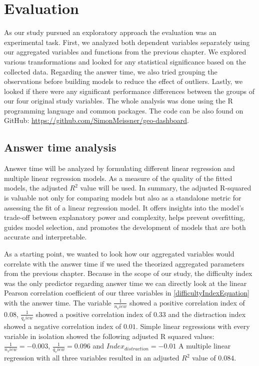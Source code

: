 \chapter{Evaluation}
As our study pursued an exploratory approach the evaluation was an experimental task. First, we analyzed both dependent variables separately
using our aggregated variables and functions from the previous chapter. We explored various transformations and looked for any statistical
significance based on the collected data. Regarding the answer time, we also tried grouping the observations before building models to reduce the 
effect of outliers. Lastly, we looked if there were any significant performance differences between
the groups of our four original study variables. The whole analysis was done using the R programming language and common packages. The code can be also
found on GitHub: \url{https://github.com/SimonMeissner/geo-dashboard}.

\section{Answer time analysis}
Answer time will be analyzed by formulating different linear regression and multiple linear regression models. As a measure of the quality of
the fitted models, the adjusted $R^2$ value will be used. In summary, the adjusted R-squared is valuable not only for comparing models but also as a
standalone metric for assessing the fit of a linear regression model. It offers insights into the model's trade-off between explanatory power and
complexity, helps prevent overfitting, guides model selection, and promotes the development of models that are both accurate and interpretable.

As a starting point, we wanted to look how our aggregated variables would correlate with the answer time if we used the theorized aggregated parameters
from the previous chapter. Because in the scope of our study, the difficulty index was the only predictor regarding answer time we can directly look at the
linear Pearson correlation coefficient of our three variables in \ref{difficultyIndexEquation} with the answer time.
The variable $\frac{1}{n_view}$ showed a positive correlation index of $0.08$, $\frac{1}{q_view}$ showed a positive correlation index of $0.33$
and the distraction index showed a negative correlation index of $0.01$. Simple linear regressions with every variable in isolation showed the following
adjusted R squared values: $\frac{1}{n_view} = -0.003$, $\frac{1}{q_view} = 0.096$ and $Index_{distraction} = -0.01$
A multiple linear regression with all three variables resulted in an adjusted $R^2$ value of $0.084$.


